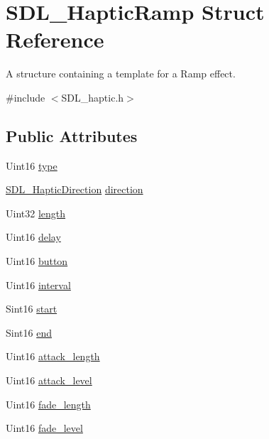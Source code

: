 \hypertarget{struct_s_d_l___haptic_ramp}{}\section{S\+D\+L\+\_\+\+Haptic\+Ramp Struct Reference}
\label{struct_s_d_l___haptic_ramp}


A structure containing a template for a Ramp effect.  




{\ttfamily \#include $<$S\+D\+L\+\_\+haptic.\+h$>$}

\subsection*{Public Attributes}
\begin{DoxyCompactItemize}
\item 
Uint16 \mbox{\hyperlink{struct_s_d_l___haptic_ramp_aca1c2349372433822ab62f60976640aa}{type}}
\item 
\mbox{\hyperlink{struct_s_d_l___haptic_direction}{S\+D\+L\+\_\+\+Haptic\+Direction}} \mbox{\hyperlink{struct_s_d_l___haptic_ramp_a6fb6c67ccf262b8f3ec08bcdf08f9965}{direction}}
\item 
Uint32 \mbox{\hyperlink{struct_s_d_l___haptic_ramp_a57e75237507701405af2a3caf34cdb5a}{length}}
\item 
Uint16 \mbox{\hyperlink{struct_s_d_l___haptic_ramp_ac9471016f41919b4a1c786bbd649a777}{delay}}
\item 
Uint16 \mbox{\hyperlink{struct_s_d_l___haptic_ramp_a2027c6fd88f1ebe652c90c71410ee0bf}{button}}
\item 
Uint16 \mbox{\hyperlink{struct_s_d_l___haptic_ramp_a4b89d108cfa7e96ea58b58771334c33d}{interval}}
\item 
Sint16 \mbox{\hyperlink{struct_s_d_l___haptic_ramp_acc0e813ac6399290fd4a788d2471e8d4}{start}}
\item 
Sint16 \mbox{\hyperlink{struct_s_d_l___haptic_ramp_a16dd3ee307795248e21ee45ba8fb4c6c}{end}}
\item 
Uint16 \mbox{\hyperlink{struct_s_d_l___haptic_ramp_adbcd7ffb05016d442c73e81cc0fcbbd2}{attack\+\_\+length}}
\item 
Uint16 \mbox{\hyperlink{struct_s_d_l___haptic_ramp_a755933bbda14ae9b53c574b9fe6291a0}{attack\+\_\+level}}
\item 
Uint16 \mbox{\hyperlink{struct_s_d_l___haptic_ramp_ad58a8f7cfdf659b45f0503fc56db7436}{fade\+\_\+length}}
\item 
Uint16 \mbox{\hyperlink{struct_s_d_l___haptic_ramp_a66b586f2e6a23a085a7b2854f61752c5}{fade\+\_\+level}}
\end{DoxyCompactItemize}


